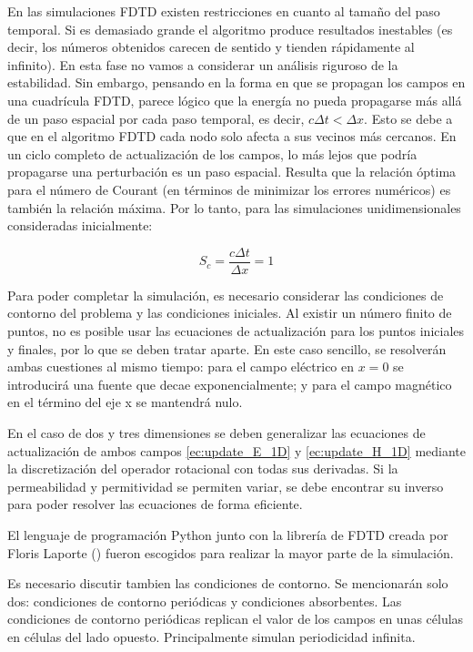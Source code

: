 En las simulaciones FDTD existen restricciones en cuanto al tamaño del paso temporal. Si es demasiado grande el algoritmo produce resultados inestables (es decir, los números obtenidos carecen de sentido y tienden rápidamente al infinito). En esta fase no vamos a considerar un análisis riguroso de la estabilidad. Sin embargo, pensando en la forma en que se propagan los campos en una cuadrícula FDTD, parece lógico que la energía no pueda propagarse más allá de un paso espacial por cada paso temporal, es decir, $c\Delta t < \Delta x$. Esto se debe a que en el algoritmo FDTD cada nodo solo afecta a sus vecinos más cercanos. En un ciclo completo de actualización de los campos, lo más lejos que podría propagarse una perturbación es un paso espacial. Resulta que la relación óptima para el número de Courant (en términos de minimizar los errores numéricos) es también la relación máxima. Por lo tanto, para las simulaciones unidimensionales consideradas inicialmente:

\begin{equation}
    S_c = \frac{c\Delta t}{\Delta x} = 1
\end{equation}

Para poder completar la simulación, es necesario considerar las condiciones de contorno del problema y las condiciones iniciales. Al existir un número finito de puntos, no es posible usar las ecuaciones de actualización para los puntos iniciales y finales, por lo que se deben tratar aparte. En este caso sencillo, se resolverán ambas cuestiones al mismo tiempo: para el campo eléctrico en $x = 0$ se introducirá una fuente que decae exponencialmente; y para el campo magnético en el término del eje x se mantendrá nulo. 

En el caso de dos y tres dimensiones se deben generalizar las ecuaciones de actualización de ambos campos \ref{ec:update_E_1D} y \ref{ec:update_H_1D} mediante la discretización del operador rotacional con todas sus derivadas. Si la permeabilidad y permitividad se permiten variar, se debe encontrar su inverso para poder resolver las ecuaciones de forma eficiente. 

El lenguaje de programación Python junto con la librería de FDTD creada por Floris Laporte (\cite{laport_python_nodate}) fueron escogidos para realizar la mayor parte de la simulación. 

Es necesario discutir tambien las condiciones de contorno. Se mencionarán solo dos: condiciones de contorno periódicas y condiciones absorbentes. Las condiciones de contorno periódicas replican el valor de los campos en unas células en células del lado opuesto. Principalmente simulan periodicidad infinita. 

